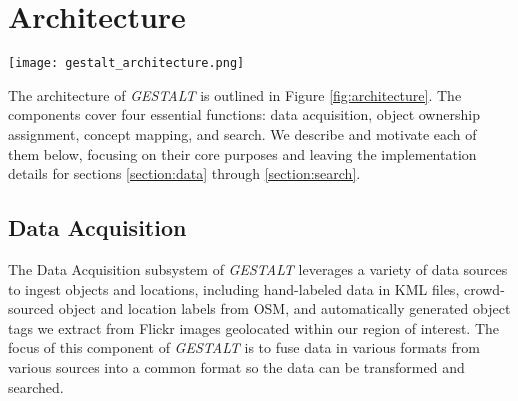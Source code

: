 \section{Architecture}
\label{section:architecture}

\begin{figure*}[t]
    \texttt{[image: gestalt\_architecture.png]}
    \centering
    \caption[width=\textwidth]{The architecture of \emph{GESTALT} consists of the data collection subsystem, the ownership assignment process, the concept mapping process and the search subsystem.}
    \label{fig:architecture}
\end{figure*}

The architecture of \textit{GESTALT} is outlined in Figure \ref{fig:architecture}. The components cover four essential functions: data acquisition, object ownership assignment, concept mapping, and search. 
We describe and motivate each of them below, focusing on their core purposes and leaving the implementation details for sections \ref{section:data} through \ref{section:search}. 

\subsection{Data Acquisition}
The Data Acquisition subsystem of \emph{GESTALT} leverages a variety of data sources to ingest objects and locations, including hand-labeled data in KML files, crowd-sourced object and location labels from OSM, and automatically generated object tags we extract from Flickr images geolocated within our region of interest. 
The focus of this component of \emph{GESTALT} is to fuse data in various formats from various sources into a common format so the data can be transformed and searched.

